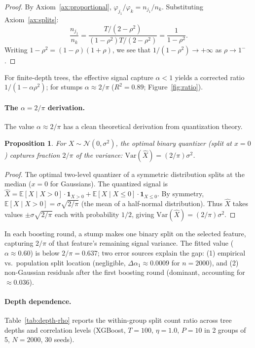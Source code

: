 \documentclass{article}
\newtheorem{proposition}[theorem]{Proposition}
\newcommand{\E}{\mathbb{E}}
\newcommand{\Var}{\mathrm{Var}}
\begin{document}
\begin{proof}
By Axiom~\ref{ax:proportional}, $\varphi_{j_1}/\varphi_k = n_{j_1}/n_k$.
Substituting Axiom~\ref{ax:splits}:
\[
    \frac{n_{j_1}}{n_k} = \frac{T/(2-\rho^2)}{(1-\rho^2)T/(2-\rho^2)} = \frac{1}{1-\rho^2}.
\]
Writing $1-\rho^2 = (1-\rho)(1+\rho)$, we see that $1/(1-\rho^2) \to +\infty$ as $\rho \to 1^-$.
\end{proof}

For finite-depth trees, the effective signal capture $\alpha < 1$ yields a corrected ratio $1/(1{-}\alpha\rho^2)$; for stumps $\alpha \approx 2/\pi$ ($R^2{=}0.89$; Figure~\ref{fig:ratio}).

\paragraph{The $\alpha = 2/\pi$ derivation.}
The value $\alpha \approx 2/\pi$ has a clean theoretical derivation from quantization theory.

\begin{proposition}
For $X \sim \mathcal{N}(0, \sigma^2)$, the optimal binary quantizer (split at $x = 0$) captures fraction $2/\pi$ of the variance: $\Var(\hat{X}) = (2/\pi)\sigma^2$.
\end{proposition}

\begin{proof}
The optimal two-level quantizer of a symmetric distribution splits at the median ($x = 0$ for Gaussians). The quantized signal is $\hat{X} = \E[X \mid X > 0] \cdot \mathbf{1}_{X > 0} + \E[X \mid X \leq 0] \cdot \mathbf{1}_{X \leq 0}$. By symmetry, $\E[X \mid X > 0] = \sigma\sqrt{2/\pi}$ (the mean of a half-normal distribution). Thus $\hat{X}$ takes values $\pm\sigma\sqrt{2/\pi}$ each with probability $1/2$, giving $\Var(\hat{X}) = (2/\pi)\sigma^2$.
\end{proof}

In each boosting round, a stump makes one binary split on the selected feature, capturing $2/\pi$ of that feature's remaining signal variance. The fitted value ($\alpha \approx 0.60$) is below $2/\pi = 0.637$; two error sources explain the gap: (1) empirical vs.\ population split location (negligible, $\Delta\alpha_1 \approx 0.0009$ for $n = 2000$), and (2) non-Gaussian residuals after the first boosting round (dominant, accounting for $\approx 0.036$).

\paragraph{Depth dependence.}
Table~\ref{tab:depth-rho} reports the within-group split count ratio
across tree depths and correlation levels (XGBoost, $T{=}100$, $\eta{=}1.0$,
$P{=}10$ in 2 groups of 5, $N{=}2000$, 30 seeds).
\end{document}
